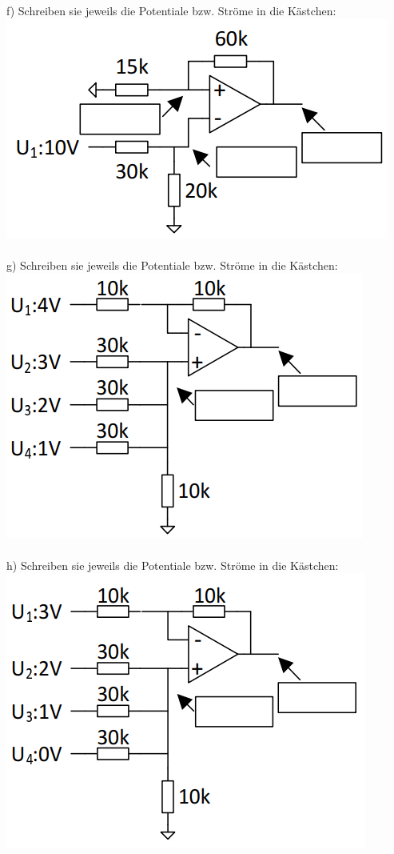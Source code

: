 \documentclass[A4]{scrreprt}
\begin{document}
  f) Schreiben sie jeweils die Potentiale bzw. Ströme in die Kästchen:\\
  \includegraphics{Schaltung11.png}\\\\
  g) Schreiben sie jeweils die Potentiale bzw. Ströme in die Kästchen:\\
  \includegraphics{Schaltung12.png}\\\\
  h) Schreiben sie jeweils die Potentiale bzw. Ströme in die Kästchen:\\
  \includegraphics{Schaltung13.png}\\\\
\end{document}

